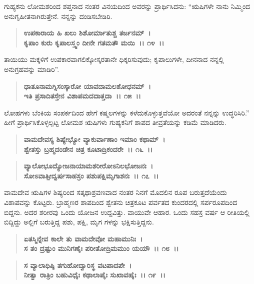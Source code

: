 ಗುಹ್ಯಕನು ಲೋಮಶರಿಂದ ಶಪ್ತನಾದ ನಂತರ ವಿನಯದಿಂದ ಅವರನ್ನು ಪ್ರಾರ್ಥಿಸಿದನು: “ಋಷಿಗಳೇ ನಾನು ನಿಮ್ಮಿಂದ ಅನುಗೃಹೀತನಾಗಿರುತ್ತೇನೆ. ನನ್ನನ್ನು ದಂಡಿಸಬೇಡಿರಿ.

\begin{verse}
\textbf{ಉಪಕಾರಾಯ ಹಿ ಖಲು ಶಿಶೋರ್ಮಾತುಶ್ಚ ತರ್ಜನಮ್~।}\\\textbf{ಕೃಪಾಂ ಕುರು ಕೃಪಾಲಸ್ತ್ವಂ ದೀನೇ ಗತಮತೌ ಮಯಿ~।। ೧೪~।।}
\end{verse}

ತಾಯಿಯು ಮಕ್ಕಳಿಗೆ ಉಪಕಾರವಾಗಲಿಕ್ಕೋಸ್ಕರತಾನೇ ಧಿಕ್ಕರಿಸುವುದು; ಕೃಪಾಲುಗಳೇ, ದೀನನಾದ ನನ್ನಲ್ಲಿ ಅನುಗ್ರಹವನ್ನು ಮಾಡಿರಿ”.

\begin{verse}
\textbf{ಧಾತೂನಾಮಗ್ನಿಸಂಸ್ಕಾರೋ ಯಾವದಾಮಲಶೋಧನಮ್~।}\\\textbf{ಇತಿ ಪ್ರಸಾದಿತಸ್ತೇನ ವಿಶಾಪಮದದಾತ್ತದಾ~।। ೧೫~।।}
\end{verse}

ಲೋಹಗಳು ಬೆಂಕಿಯ ಸಂಪರ್ಕದಿಂದ ಹೇಗೆ ಕಷ್ಮಲಗಳನ್ನು ಕಳೆದುಕೊಳ್ಳುತ್ತವೆಯೋ ಅದರಂತೆ ನನ್ನನ್ನು ಉದ್ಧರಿಸಿರಿ.” ಹೀಗೆ ಪ್ರಾರ್ಥಿಸಿಕೊಳ್ಳಲ್ಪಟ್ಟ ಲೋಮಶ ಋಷಿಗಳು ಗುಹ್ಯಕನಿಗೆ ಶಾಪದ ತೀವ್ರತೆಯನ್ನು ಕಡಿಮೆ ಮಾಡಿದರು.

\begin{verse}
\textbf{ವಾಮದೇವಸ್ಯ ಶಿಷ್ಯೇಭ್ಯೋ ವ್ಯಾಕುರ್ವಾಣಾಂ ಇಮಾಂ ಕಥಾಮ್~।}\\\textbf{ಶ್ವೇತಸ್ತು ಬ್ರಹ್ಮದಂಡೇನ ಚಿತ್ರ ಕೂಟಾದ್ರಿಕಂದರೇ~।। ೧೬~।।}
\end{verse}

\begin{verse}
\textbf{ವ್ಯಾಲೋಭೂದ್ಯೋಜನಾಯಾಮಶರೀರೋಽನಿಲಭೋಜನಃ~।}\\\textbf{ಸೋಽವಾತ್ಸೀದ್ವರ್ಷಸಾಹಸ್ರಂ ಪಶುಪಕ್ಷಿಮೃಗಾಶನಃ~।। ೧೭~।।}
\end{verse}

ವಾಮದೇವ ಋಷಿಗಳ ಶಿಷ್ಯರಿಂದ ಸತ್ಕಥಾಶ್ರವಣವಾದ ನಂತರ ನಿನಗೆ ಮೊದಲಿನ ರೂಪ ಬರುತ್ತದೆಯೆಂದು ವಿಶಾಪವನ್ನು ಕೊಟ್ಟರು. ಬ್ರಾಹ್ಮಣರ ಶಾಪದಿಂದ ಶ್ವೇತನು ಚಿತ್ರಕೂಟ ಪರ್ವತದ ಕುಂದರದಲ್ಲಿ ಸರ್ಪರೂಪದಿಂದ ಬಿದ್ದನು. ಅದರ ಶರೀರವು ಒಂದು ಯೋಜನ ಉದ್ದವಿತ್ತು. ವಾಯುವೇ ಆಹಾರ. ಒಂದು ಸಹಸ್ರ ವರ್ಷ ಆ ರೀತಿಯಲ್ಲಿ ಬಿದ್ದಿದ್ದು ಅಲ್ಲಿಗೆ ಬರುತ್ತಿದ್ದ ಪಶು, ಪಕ್ಷಿ, ಮೃಗ ಗಳನ್ನು ಭಕ್ಷಿಸುತ್ತಿದ್ದನು.

\begin{verse}
\textbf{ಏತಸ್ಮಿನ್ನೇವ ಕಾಲೇ ತು ವಾಮದೇವೋ ಮಹಾಮುನಿಃ~।}\\\textbf{ಸ ತಂ ದ್ರಷ್ಟುಂ ಮುನಿಗಣೈಃ ಪರೀತೋದ್ರಿಮಮುಂ ಯಯೌ~।। ೧೮~।। }
\end{verse}

\begin{verse}
\textbf{ಸ ವ್ಯಾಲಾಧಿಷ್ಠಿ ತಗುಹೋದ್ವಾರಿಸ್ಥ ವಟಪಾದಪೇ~।}\\\textbf{ನೀತ್ವಾ ರಾತ್ರಿಂ ಬಹುವಿಧೈಃ ಕಥಾಲಾಪೈಃ ಸುಖಾವಹೈಃ~।। ೧೯~।।}
\end{verse}


